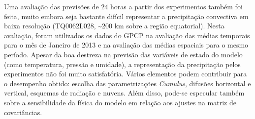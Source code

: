 Uma avaliação das previsões de 24 horas a partir dos experimentos também foi feita, muito embora seja bastante difícil representar a precipitação convectiva em baixa resolução (TQ0062L028, \textasciitilde{}200 km sobre a região equatorial). Nesta avaliação, foram utilizados os dados do GPCP na avaliação das médias temporais para o mês de Janeiro de 2013 e na avaliação das médias espaciais para o mesmo período. Apesar da boa destreza na previsão das variáveis de estado do modelo (como temperatura, pressão e umidade), a representação da precipitação pelos experimentos não foi muito satisfatória. Vários elementos podem contribuir para o desempenho obtido: escolha das parametrizações \textit{Cumulus}, difusões horizontal e vertical, esquemas de radiação e nuvens. Além disso, pode-se especular também sobre a sensibilidade da física do modelo em relação aos ajustes na matriz de covariâncias. %

